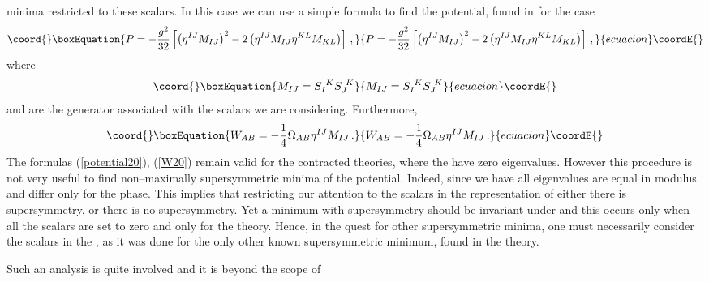 \documentclass[a4paper,12pt]{article}
\def\bar{\overline}\end {picture}}
\begin{document}
minima restricted to these scalars. In this case we can use a
simple formula to find the potential, found in \cite{gunwar} for
the \coordHE{} case
\begin{equation}\coord{}\boxEquation{
\label{potential20} P=-{g^2\over
32}\left[\left(\eta^{IJ}M_{IJ}\right)^2-2\left(\eta^{IJ}M_{IJ}
\eta^{KL}M_{KL}\right)\right]\,,
}{
P=-{g^2\over
32}\left[\left(\eta^{IJ}M_{IJ}\right)^2-2\left(\eta^{IJ}M_{IJ}
\eta^{KL}M_{KL}\right)\right]\,,
}{ecuacion}\coordE{}\end{equation}
where
\begin{equation}\coord{}\boxEquation{
M_{IJ}=S_I^{~K}S_J^{~K}
}{
M_{IJ}=S_I^{~K}S_J^{~K}
}{ecuacion}\coordE{}\end{equation}
and \coordHE{} are the \coordHE{} generator
associated with the scalars we are considering. Furthermore,
\begin{equation}\coord{}\boxEquation{
W_{AB}=-{1\over 4}\Omega_{AB}\eta^{IJ}M_{IJ}\,. \label{W20}
}{
W_{AB}=-{1\over 4}\Omega_{AB}\eta^{IJ}M_{IJ}\,. }{ecuacion}\coordE{}\end{equation}
The formulas (\ref{potential20}), (\ref{W20}) remain valid for the
contracted theories, where the \coordHE{} have zero eigenvalues.
However this procedure is not very useful to find non--maximally
supersymmetric minima of the potential. Indeed, since we have
\coordHE{} all \coordHE{} eigenvalues \myHighlight{$\mu$}\coordHE{}  are
equal in modulus and differ only for the phase. This implies that
restricting our attention to the scalars in the \coordHE{}
representation of \coordHE{} either there is
\coordHE{} supersymmetry, or there is no supersymmetry. Yet a
minimum with \coordHE{} supersymmetry should be invariant
under  \coordHE{} and this occurs only when all the
scalars are set to zero and only for the \coordHE{} theory.
Hence, in the quest for other supersymmetric minima,  one must
necessarily consider the scalars in the \myHighlight{$\bf
10\oplus\bar{10}\oplus 1\oplus\bar{1}$}\coordHE{}, as it was done for the
only other known supersymmetric minimum, found \cite{N2minimum} in
the \coordHE{} theory.
\par
Such an analysis is quite involved and it is beyond the scope of
\end{document}
